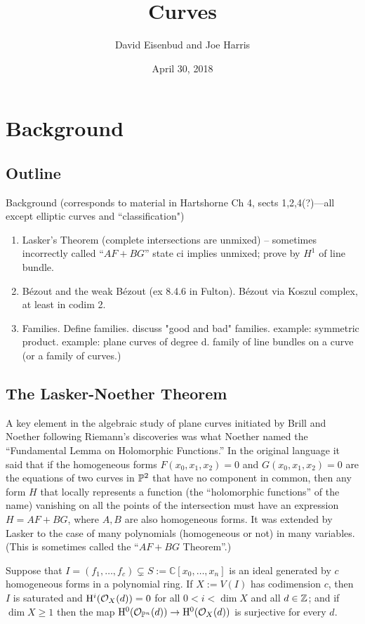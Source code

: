 \documentclass[12pt, leqno]{book}
\date{April 30, 2018}
\title{Curves}
\author{David Eisenbud and Joe Harris }
\def\CC{{\mathbb C}}
\begin{document}
\chapter{Background}
\section*{Outline}
 Background (corresponds to material in Hartshorne Ch 4, sects 1,2,4(?)---all except elliptic curves and ``classification")
\begin{enumerate}

\item Lasker's Theorem (complete intersections are unmixed) -- sometimes incorrectly called ``$AF+BG$''
state ci implies unmixed; prove by $H^1$ of line bundle.

\item B\'ezout and the  weak B\'ezout (ex 8.4.6 in Fulton).
B\'ezout via Koszul complex, at least in codim 2.

\item Families. Define families. discuss "good and bad" families. example: symmetric product. example: plane curves of degree d. family of line bundles on a curve (or a family of curves.)


\end{enumerate}


\section{The Lasker-Noether Theorem}

A key element in the algebraic study of plane curves initiated by Brill and Noether following Riemann's discoveries was what Noether named the ``Fundamental Lemma on Holomorphic Functions.'' In the original language it said that if the homogeneous forms $F(x_{0},x_{1},x_{2})=0$ and $G(x_{0},x_{1},x_{2})=0$ are the equations of two curves in $\PP^{2}$ that have no component in common, then any form $H$ that locally represents a function (the ``holomorphic functions'' of the name) vanishing on all the points
of the intersection must have an expression $H = AF+BG$, where $A,B$ are also homogeneous forms. It was extended by Lasker to the case of many polynomials (homogeneous or not) in many variables. (This is sometimes called the ``$AF+BG$ Theorem''.) 

\begin{theorem}\label{Lasker}
Suppose that $I = (f_{1}, \dots, f_{c}) \subsetneq S:=\CC[x_{0},\dots,x_{n}]$ is an ideal generated by $c$ homogeneous forms in a polynomial ring. 
If $X:= V(I)$ has codimension $c$, then $I$ is saturated and $\HH^{i}(\cO_{X}(d)) = 0$ for all $0<i<\dim X$ and all $d\in \ZZ$; and if $\dim X\geq 1$
then the map
$\HH^{0}(\cO_{\PP^{n}}(d)) \to \HH^{0}(\cO_{X}(d))$ is surjective for every $d$.
\end{theorem}
\end{document}
